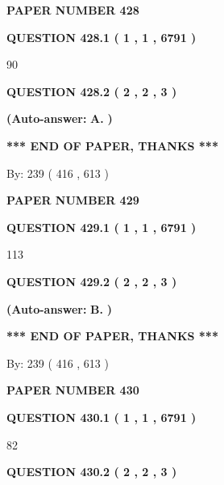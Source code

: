 \documentclass{ctexart}
\begin{document}
   
\newpage 
\setcounter{page}{ 
   428001 } 
   
   
 {\textbf{ \Large{ PAPER NUMBER  428  }}}
   
   
   
   
  
  
{\textbf{\large{QUESTION
428.1 
 ( 1 , 1 , 6791 )
}}}

90
  
  
{\textbf{\large{QUESTION
428.2 
 ( 2 , 2 , 3 )
}}}
 
 
{\textbf{(Auto-answer:}}
{\textbf{\large{
A.}}}
{\textbf{)}}
 
 
   
   
   
   
\vspace{1.0in} 
{\textbf{\large{ *** END OF PAPER, THANKS *** }}} 
   
   
\hspace{1.0in} By: 
 239 ( 416 ,  613 )
   
   
   
   
\newpage 
\setcounter{page}{ 
   429001 } 
   
   
 {\textbf{ \Large{ PAPER NUMBER  429  }}}
   
   
   
   
  
  
{\textbf{\large{QUESTION
429.1 
 ( 1 , 1 , 6791 )
}}}

113
  
  
{\textbf{\large{QUESTION
429.2 
 ( 2 , 2 , 3 )
}}}
 
 
{\textbf{(Auto-answer:}}
{\textbf{\large{
B.}}}
{\textbf{)}}
 
 
   
   
   
   
\vspace{1.0in} 
{\textbf{\large{ *** END OF PAPER, THANKS *** }}} 
   
   
\hspace{1.0in} By: 
 239 ( 416 ,  613 )
   
   
   
   
\newpage 
\setcounter{page}{ 
   430001 } 
   
   
 {\textbf{ \Large{ PAPER NUMBER  430  }}}
   
   
   
   
  
  
{\textbf{\large{QUESTION
430.1 
 ( 1 , 1 , 6791 )
}}}

82
  
  
{\textbf{\large{QUESTION
430.2 
 ( 2 , 2 , 3 )
}}}
 
\end{document}
